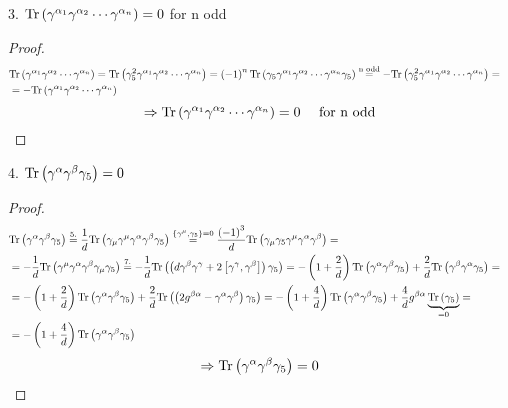 3. $\mathrm{Tr} \left( \gamma^{\alpha_1}\gamma^{\alpha_2} \cdots \gamma^{\alpha_n} \right) = 0$ for n odd
\begin{proof}
\begin{align*}
& \mathrm{Tr} \left( \gamma^{\alpha_1}\gamma^{\alpha_2} \cdots \gamma^{\alpha_n} \right) = \mathrm{Tr} \left( \gamma_5^2 \gamma^{\alpha_1}\gamma^{\alpha_2} \cdots \gamma^{\alpha_n} \right) = \left( -1 \right)^n \mathrm{Tr} \left(\gamma_5 \gamma^{\alpha_1}\gamma^{\alpha_2} \cdots \gamma^{\alpha_n} \gamma_5 \right) \overset{\text{n odd}}{=} - \mathrm{Tr} \left( \gamma_5^2 \gamma^{\alpha_1}\gamma^{\alpha_2} \cdots \gamma^{\alpha_n} \right) = & \\
& = - \mathrm{Tr} \left( \gamma^{\alpha_1}\gamma^{\alpha_2} \cdots \gamma^{\alpha_n} \right)
\end{align*}
\begin{equation*}
\Rightarrow \mathrm{Tr} \left( \gamma^{\alpha_1}\gamma^{\alpha_2} \cdots \gamma^{\alpha_n} \right) = 0 \quad \text{ for n odd}
\end{equation*}
\end{proof}

4. $\mathrm{Tr} \left( \gamma^{\alpha}\gamma^{\beta} \gamma_5 \right) = 0$
\begin{proof}
\begin{align*}
&\mathrm{Tr} \left( \gamma^{\alpha}\gamma^{\beta} \gamma_5 \right) \overset{5.}{=} \frac{1}{d}\mathrm{Tr} \left( \gamma_{\mu}\gamma^{\mu}\gamma^{\alpha}\gamma^{\beta} \gamma_5 \right) \overset{\left\lbrace \gamma^{\mu},\gamma_5 \right\rbrace =0}{=}  \frac{\left(-1\right)^3}{d} \mathrm{Tr} \left( \gamma_{\mu}\gamma_5\gamma^{\mu}\gamma^{\alpha}\gamma^{\beta} \right) = & \\
& = -\frac{1}{d} \mathrm{Tr} \left(\gamma^{\mu}\gamma^{\alpha}\gamma^{\beta}\gamma_{\mu}\gamma_5 \right) \overset{7.}{=} -\frac{1}{d} \mathrm{Tr} \left( \left( d\gamma^{\beta}\gamma^{\gamma} + 2 \left[ \gamma^{\gamma}, \gamma^{\beta} \right] \right) \gamma_5 \right) = - \left(1+\frac{2}{d}\right) \mathrm{Tr} \left( \gamma^{\alpha}\gamma^{\beta}\gamma_5 \right) + \frac{2}{d} \mathrm{Tr} \left( \gamma^{\beta}\gamma^{\alpha}\gamma_5 \right) =  & \\
& = - \left(1+\frac{2}{d}\right) \mathrm{Tr} \left( \gamma^{\alpha}\gamma^{\beta}\gamma_5 \right) + \frac{2}{d} \mathrm{Tr} \left( \left( 2g^{\beta\alpha} - \gamma^{\alpha}\gamma^{\beta} \right)\gamma_5 \right) = - \left(1+\frac{4}{d}\right) \mathrm{Tr} \left( \gamma^{\alpha}\gamma^{\beta}\gamma_5 \right) + \frac{4}{d} g^{\beta\alpha} \underbrace{\mathrm{Tr} \left(\gamma_5 \right)}_{=0} = & \\
& = - \left(1+\frac{4}{d} \right) \mathrm{Tr} \left( \gamma^{\alpha}\gamma^{\beta} \gamma_5 \right) &
\end{align*}
\begin{equation*}
\Rightarrow \mathrm{Tr} \left( \gamma^{\alpha}\gamma^{\beta} \gamma_5 \right) = 0
\end{equation*}
\end{proof}

